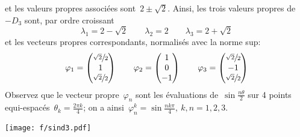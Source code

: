 et les valeurs propres associées sont~$2\pm\sqrt 2$.
Ainsi, les trois valeurs
propres de~$-D_3$ sont, par ordre croissant
\[
	\lambda_1 = 2-\sqrt2
	\qquad
	\lambda_2 = 2
	\qquad
	\lambda_3 = 2+\sqrt2
\]
et les vecteurs propres correspondants, normalisés avec la norme sup:
\[
	\varphi_1=\begin{pmatrix}
		\sfrac{\sqrt2}2\\
		1\\
		\sfrac{\sqrt2}2
	\end{pmatrix}
	\qquad
	\varphi_2=\begin{pmatrix}
		1\\
		0\\
		-1
	\end{pmatrix}
	\qquad
	\varphi_3=\begin{pmatrix}
		\sfrac{\sqrt2}2\\
		-1\\
		\sfrac{\sqrt2}2
	\end{pmatrix}
\]
Observez que le vecteur propre~$\varphi_n$ sont les évaluations
de~$\sin\tfrac{n\theta}2$
sur 4 points equi-espacés~$\theta_k=\tfrac{2\pi k}{4}$; on a
ainsi~$\varphi_n^k=\sin\frac{nk\pi}4,\ k,\!n=1,2,3$.

\begin{center}
\texttt{[image: f/sind3.pdf]}
\end{center}

